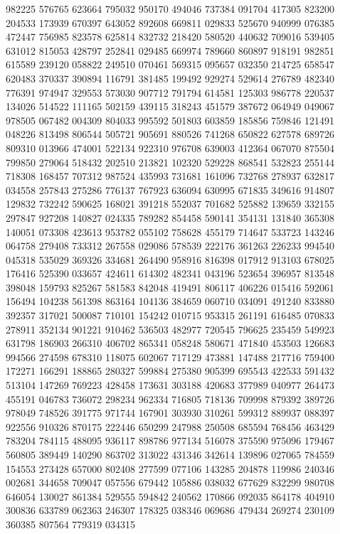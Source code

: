 {982225 576765 623664 795032 950170 494046 737384 091704 417305 823200 204533%
173939 670397 643052 892608 669811 029833 525670 940999 076385 472447 756985%
823578 625814 832732 218420 580520 440632 709016 539405 631012 815053 428797%
252841 029485 669974 789660 860897 918191 982851 615589 239120 058822 249510%
070461 569315 095657 032350 214725 658547 620483 370337 390894 116791 381485%
199492 929274 529614 276789 482340 776391 974947 329553 573030 907712 791794%
614581 125303 986778 220537 134026 514522 111165 502159 439115 318243 451579%
387672 064949 049067 978505 067482 004309 804033 995592 501803 603859 185856%
759846 121491 048226 813498 806544 505721 905691 880526 741268 650822 627578%
689726 809310 013966 474001 522134 922310 976708 639003 412364 067070 875504%
799850 279064 518432 202510 213821 102320 529228 868541 532823 255144 718308%
168457 707312 987524 435993 731681 161096 732768 278937 632817 034558 257843%
275286 776137 767923 636094 630995 671835 349616 914807 129832 732242 590625%
168021 391218 552037 701682 525882 139659 332155 297847 927208 140827 024335%
789282 854458 590141 354131 131840 365308 140051 073308 423613 953782 055102%
758628 455179 714647 533723 143246 064758 279408 733312 267558 029086 578539%
222176 361263 226233 994540 045318 535029 369326 334681 264490 958916 816398%
017912 913103 678025 176416 525390 033657 424611 614302 482341 043196 523654%
396957 813548 398048 159793 825267 581583 842048 419491 806117 406226 015416%
592061 156494 104238 561398 863164 104136 384659 060710 034091 491240 833880%
392357 317021 500087 710101 154242 010715 953315 261191 616485 070833 278911%
352134 901221 910462 536503 482977 720545 796625 235459 549923 631798 186903%
266310 406702 865341 058248 580671 471840 453503 126683 994566 274598 678310%
118075 602067 717129 473881 147488 217716 759400 172271 166291 188865 280327%
599884 275380 905399 695543 422533 591432 513104 147269 769223 428458 173631%
303188 420683 377989 040977 264473 455191 046783 736072 298234 962334 716805%
718136 709998 879392 389726 978049 748526 391775 971744 167901 303930 310261%
599312 889937 088397 922556 910326 870175 222446 650299 247988 250508 685594%
768456 463429 783204 784115 488095 936117 898786 977134 516078 375590 975096%
179467 560805 389449 140290 863702 313022 431346 342614 139896 027065 784559%
154553 273428 657000 802408 277599 077106 143285 204878 119986 240346 002681%
344658 709047 057556 679442 105886 038032 677629 832299 980708 646054 130027%
861384 529555 594842 240562 170866 092035 864178 404910 300836 633789 062363%
246307 178325 038346 069686 479434 269274 230109 360385 807564 779319 034315%
}
